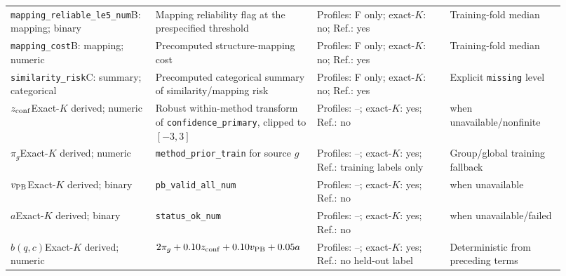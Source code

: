 \begin{longtable}{@{}>{\raggedright\arraybackslash}p{0.22\linewidth}>{\raggedright\arraybackslash}p{0.27\linewidth}>{\raggedright\arraybackslash}p{0.23\linewidth}>{\raggedright\arraybackslash}p{0.20\linewidth}@{}}
\texttt{mapping_reliable_le5_num}\newline B: mapping; binary & Mapping reliability flag at the prespecified threshold & Profiles: F only; exact-$K$: no; Ref.: yes & Training-fold median\\
\texttt{mapping_cost}\newline B: mapping; numeric & Precomputed structure-mapping cost & Profiles: F only; exact-$K$: no; Ref.: yes & Training-fold median\\
\texttt{similarity_risk}\newline C: summary; categorical & Precomputed categorical summary of similarity/mapping risk & Profiles: F only; exact-$K$: no; Ref.: yes & Explicit \texttt{missing} level\\
$z_{\rm conf}$\newline Exact-$K$ derived; numeric & Robust within-method transform of \texttt{confidence_primary}, clipped to $[-3,3]$ & Profiles: --; exact-$K$: yes; Ref.: no & 0 when unavailable/nonfinite\\
$\pi_g$\newline Exact-$K$ derived; numeric & \texttt{method_prior_train} for source $g$ & Profiles: --; exact-$K$: yes; Ref.: training labels only & Group/global training fallback\\
$v_{\rm PB}$\newline Exact-$K$ derived; binary & \texttt{pb_valid_all_num} & Profiles: --; exact-$K$: yes; Ref.: no & 0 when unavailable\\
$a$\newline Exact-$K$ derived; binary & \texttt{status_ok_num} & Profiles: --; exact-$K$: yes; Ref.: no & 0 when unavailable/failed\\
$b(q,c)$\newline Exact-$K$ derived; numeric & $2\pi_g+0.10z_{\rm conf}+0.10v_{\rm PB}+0.05a$ & Profiles: --; exact-$K$: yes; Ref.: no held-out label & Deterministic from preceding terms\\
\end{longtable}
\endgroup
